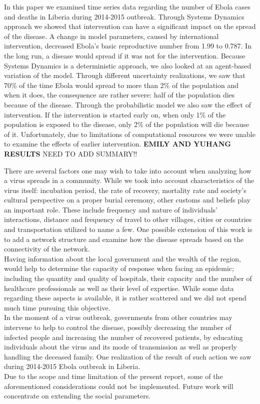 In this paper we examined time series data  regarding the number of Ebola cases and deaths in Liberia during 2014-2015 outbreak. Through Systems Dynamics approach we showed that intervention can have a significant impact on the spread of the disease. A change in model parameters, caused by international intervention, decreased Ebola's basic reproductive number from 1.99 to 0.787. In the long run, a disease would spread if it was not for the intervention. Because Systems Dynamics is a deterministic approach, we also looked at an agent-based variation of the model. Through different uncertainty realizations, we saw that  70\% of the time Ebola would spread to more than 2\% of the population and when it does, the consequence are rather severe: half of the population dies because of the disease. Through the probabilistic model we also saw the effect of intervention. If the intervention is started early on, when only 1\% of the population is exposed to the disease, only 2\% of the population will die because of it. Unfortunately, due to limitations of computational resources we were unable to examine the effects of earlier intervention. \textbf{EMILY AND YUHANG RESULTS}
NEED TO ADD SUMMARY!!

There are several factors one may wish to take into account when analyzing how a virus spreads in a community. While we took into account characteristics of the virus itself: incubation period, the rate of recovery, mortality rate and society's cultural perspective on a proper burial ceremony, other customs and beliefs play an important role. These include frequency and nature of individuals' interactions, distance and frequency of travel to other villages, cities or countries and transportation utilized to name a few. One possible extension of this work is to add a network structure and examine how the disease spreads based on the connectivity of the network.\\
Having information about the local government and the wealth of the region, would help to determine the capacity of response when facing an epidemic; including the quantity and quality of hospitals, their capacity and the number of healthcare professionals as well as 
their level of  expertise. While some data regarding these aspects is available, it is rather scattered and we did not spend much time pursuing this objective. \\
In the moment of a virus outbreak, governments from other countries may intervene to help to control the disease, possibly decreasing the number of infected people and increasing the number of recovered patients, by educating individuals about the virus and its mode of transmission as well as properly handling the deceased family. One realization of the result of such action we saw during 2014-2015 Ebola outbreak in Liberia.  \\
Due to the scope and time limitation of the present report, some of the aforementioned considerations could not be implemented. Future work will concentrate on extending the social parameters. 


